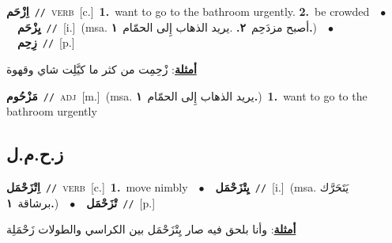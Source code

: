 \documentclass[10pt,a4paper,twoside]{article} %
\begin{document}
\begin{multicols}{2}
{{{{{{{{{\setlength\topsep{0pt}\textbf{\foreignlanguage{arabic}{اِزْحَم}}\ {\color{gray}\texttt{//}\color{black}}\ \textsc{verb}\ [c.]\ \textbf{1.}~want to go to the bathroom urgently.  \textbf{2.}~be crowded\ \ $\bullet$\ \ \setlength\topsep{0pt}\textbf{\foreignlanguage{arabic}{يِزْحَم}}\ {\color{gray}\texttt{//}\color{black}}\ [i.]\ \color{gray}(msa. \foreignlanguage{arabic}{أصبح مزدَحِم}~\foreignlanguage{arabic}{\textbf{٢.}}  .\foreignlanguage{arabic}{يريد الذهاب إِلى الحمّام}~\foreignlanguage{arabic}{\textbf{١.}})\color{black}\ \ $\bullet$\ \ \setlength\topsep{0pt}\textbf{\foreignlanguage{arabic}{زِحِم}}\ {\color{gray}\texttt{//}\color{black}}\ [p.]\  \begin{flushright}\color{gray}\foreignlanguage{arabic}{\textbf{\underline{\foreignlanguage{arabic}{أمثلة}}}: زْحِمِت من كثر ما كيَّلِت شاي وقهوة}\end{flushright}\color{black}} \vspace{2mm}

{\setlength\topsep{0pt}\textbf{\foreignlanguage{arabic}{مَزْحُوم}}\ {\color{gray}\texttt{//}\color{black}}\ \textsc{adj}\ [m.]\ \color{gray}(msa. \foreignlanguage{arabic}{يريد الذهاب إِلى الحمّام}~\foreignlanguage{arabic}{\textbf{١.}})\color{black}\ \textbf{1.}~want to go to the bathroom urgently\ 

\vspace{-3mm}
\subsection*{\color{blue}\foreignlanguage{arabic}{ز.ح.م.ل}\color{blue}{}} 

{\setlength\topsep{0pt}\textbf{\foreignlanguage{arabic}{اِتْزَحْمَل}}\ {\color{gray}\texttt{//}\color{black}}\ \textsc{verb}\ [c.]\ \textbf{1.}~move nimbly\ \ $\bullet$\ \ \setlength\topsep{0pt}\textbf{\foreignlanguage{arabic}{يِتْزَحْمَل}}\ {\color{gray}\texttt{//}\color{black}}\ [i.]\ \color{gray}(msa. \foreignlanguage{arabic}{يَتَحَرَّك برشاقة}~\foreignlanguage{arabic}{\textbf{١.}})\color{black}\ \ $\bullet$\ \ \setlength\topsep{0pt}\textbf{\foreignlanguage{arabic}{تْزَحْمَل}}\ {\color{gray}\texttt{//}\color{black}}\ [p.]\  \begin{flushright}\color{gray}\foreignlanguage{arabic}{\textbf{\underline{\foreignlanguage{arabic}{أمثلة}}}: وأنا بلحق فيه صار يِتْزَحْمَل بين الكراسي والطولات زَحْمَلِة}\end{flushright}\color{black}} \vspace{2mm}

}}}}}}}}}
\end{multicols}
\end{document}

